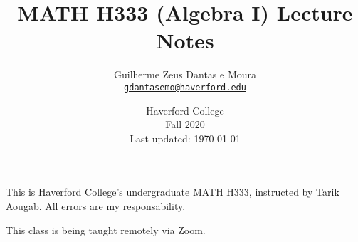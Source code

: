 \documentclass[a4paper, 10pt]{article}
\title{\sffamily \bfseries MATH H333 (Algebra I) Lecture Notes}
\author{\sc Guilherme Zeus Dantas e Moura\\\href{mailto:gdantasemo@haverford.edu}{\texttt{gdantasemo@haverford.edu}}}
\date{Haverford College\\Fall 2020\\ Last updated: \today}
\begin{document}
    \maketitle
		This is Haverford College's undergraduate MATH H333, instructed by Tarik Aougab.
		All errors are my responsability.
		
		This class is being taught remotely via Zoom.
		
		\tableofcontents

    
    
    
    
    
    
    
    
    
    
\end{document}
